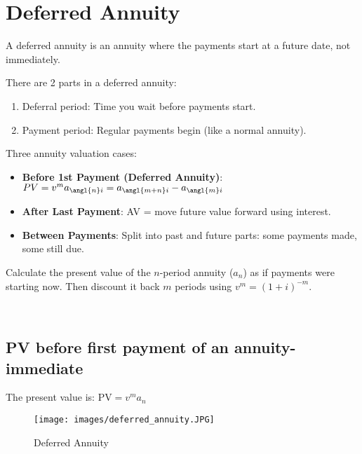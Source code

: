 



\section{Deferred Annuity}
\begin{definition}
    A deferred annuity is an annuity where the payments start at a future date, not immediately.
\end{definition}

\begin{comments}
    There are 2 parts in a deferred annuity: 
    \begin{enumerate}
        \item Deferral period: Time you wait before payments start.
        \item Payment period: Regular payments begin (like a normal annuity).
    \end{enumerate} 
    \break

    Three annuity valuation cases: 
    \begin{itemize}
        \item \textbf{Before 1st Payment (Deferred Annuity)}: $PV=v^m a_{\angl{n}i} = a_{\angl{m+n}i} - a_{\angl{m}i}$
        \item \textbf{After Last Payment}: AV = move future value forward using interest.
        \item \textbf{Between Payments}: Split into past and future parts: some payments made, some still due.
    \end{itemize}
\end{comments}
\begin{comments}
Calculate the present value of the \( n \)-period annuity (\( a_n \)) as if payments were starting now. Then discount it back \( m \) periods using \( v^m = (1 + i)^{-m} \).
\end{comments} \\

\subsection{PV before first payment of an annuity-immediate}

\begin{theorem}
The present value is:
$\text{PV} = v^m a_n$
\end{theorem}


\begin{figure}
  \centering
  \texttt{[image: images/deferred\_annuity.JPG]}
  \caption{Deferred Annuity}
  \label{fig:enter-label}
\end{figure}


